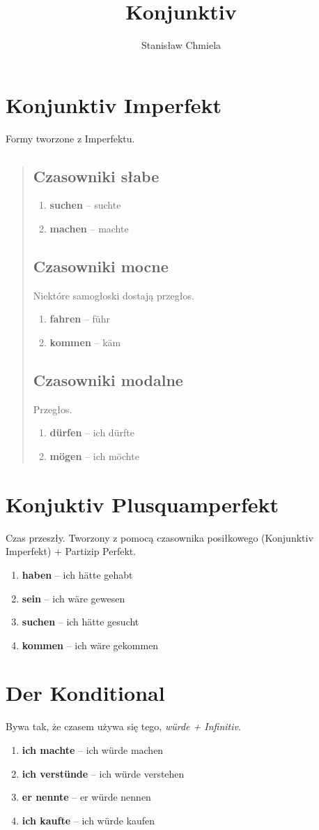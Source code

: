 \documentclass [a4paper, 12pt]{article}
\author{Stanisław Chmiela}
\title{Konjunktiv}
\begin{document}
	\section{Konjunktiv Imperfekt}
		Formy tworzone z Imperfektu.
		\begin{quote}
		\subsection{Czasowniki słabe}
			\begin{enumerate}
			\item \textbf{suchen} -- suchte
			\item \textbf{machen} -- machte
			\end{enumerate}
		\subsection{Czasowniki mocne}
			Niektóre samogłoski dostają przegłos.
			\begin{enumerate}
			\item \textbf{fahren} -- f\"uhr
			\item \textbf{kommen} -- k\"am
			\end{enumerate}
		\subsection{Czasowniki modalne}
			Przegłos.
			\begin{enumerate}
			\item \textbf{d\"urfen} -- ich d\"urfte
			\item \textbf{m\"ogen} -- ich m\"ochte
			\end{enumerate}
	\end{quote}
	\section{Konjuktiv Plusquamperfekt}
		Czas przeszły. Tworzony z pomocą czasownika posiłkowego (Konjunktiv Imperfekt) + Partizip Perfekt.
		\begin{enumerate}
		\item \textbf{haben} -- ich h\"atte gehabt
		\item \textbf{sein} -- ich w\"are gewesen
		\item \textbf{suchen} -- ich h\"atte gesucht
		\item \textbf{kommen} -- ich w\"are gekommen
		\end{enumerate}
	\section{Der Konditional}
		Bywa tak, że czasem używa się tego, \emph{w\"urde + Infinitiv}.
		\begin{enumerate}
		\item \textbf{ich machte} -- ich w\"urde machen
		\item \textbf{ich verst\"unde} -- ich w\"urde verstehen
		\item \textbf{er nennte} -- er w\"urde nennen
		\item \textbf{ich kaufte} -- ich w\"urde kaufen
		\end{enumerate}
\end{document}
